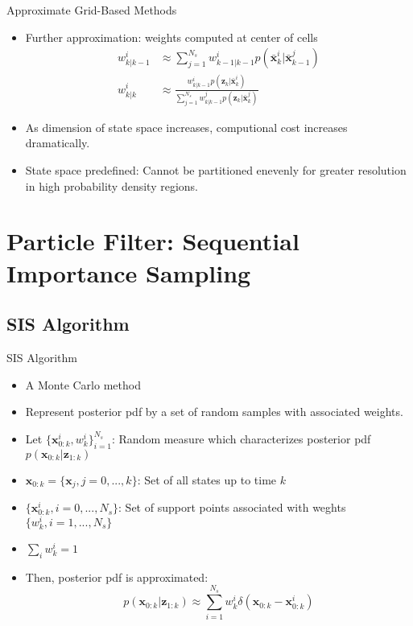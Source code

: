 \documentclass{beamer}
\newcommand{\x}{\mathbf{x}}
\newcommand{\z}{\mathbf{z}}
\begin{document}
\begin{frame}{Approximate Grid-Based Methods}%
  \begin{itemize}
  	\item {Further approximation: weights computed at center of cells
    	 \begin{align*}
        w_{k|k-1}^{i} &\approx \sum_{j=1}^{N_s} w_{k-1|k-1}^{i}  p(\bar{\x}_k^i|\bar{\x}_{k-1}^j) \\
        w_{k|k}^{i}   &\approx \frac{w_{k|k-1}^{i} p(\z_k|\bar{\x}_k^i)}
        {\sum\limits_{j=1}^{N_s} w_{k|k-1}^{j}
        p(\z_k|\bar{\x}_k^j)}
    	\end{align*}
  	}
  	\item{As dimension of state space increases, computional cost increases dramatically.
  	}
  	\item State space predefined: Cannot be partitioned enevenly for greater resolution in high probability density regions.
  \end{itemize}
\end{frame}


\section{Particle Filter: Sequential Importance Sampling}
\subsection{SIS Algorithm}

\begin{frame}{SIS Algorithm}%
  \begin{itemize}
	  \item{A Monte Carlo method
  	  }
	  \item {Represent posterior pdf by a set of random samples with associated weights.
  	  }
  	  \item{Let $ \{\x_{0:k}^{i}, w_{k}^{i}\}_{i=1}^{N_s}$: 	Random measure which characterizes posterior pdf $p(\x_{0:k}|\z_{1:k})$
  	  }	
  	  \item{$\x_{0:k}=\{\x_j, j=0, ..., k\}$: Set of all states up to time $k$
  	  }
  	  \item{$\{\x_{0:k}^{i}, i=0, ..., N_s\}$: Set of support points associated with weghts $\{w_k^i, i=1, ..., N_s\}$ 
  	  }
  	  \item{$\sum_i w_k^i=1$}
  	  \item{Then, posterior pdf is approximated:
	  	$$
        p(\x_{0:k} | \z_{1:k}) \approx \sum_{i=1}^{N_s} w_k^i \delta(\x_{0:k} - \x_{0:k}^{i})
    	$$
      }	
  \end{itemize}
\end{frame}
\end{document}

